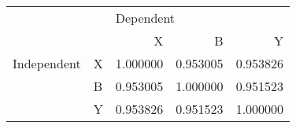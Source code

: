 \begin{tabular}{llrrr}
\toprule
            &   & \multicolumn{3}{l}{Dependent} \\
            &   &         X &         B &         Y \\
\midrule
Independent & X &  1.000000 &  0.953005 &  0.953826 \\
            & B &  0.953005 &  1.000000 &  0.951523 \\
            & Y &  0.953826 &  0.951523 &  1.000000 \\
\bottomrule
\end{tabular}
